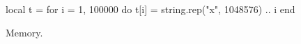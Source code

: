 \documentclass{article}
\begin{document}
\begin{luacode*}
local t = {}
for i = 1, 100000 do
  t[i] = string.rep("x", 1048576) .. i
end
\end{luacode*}
Memory.
\end{document}
